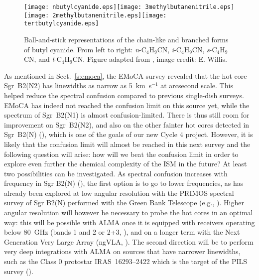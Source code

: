 \documentclass{iau}
\begin{document}
\begin{figure}
\begin{center}
\texttt{[image: nbutylcyanide.eps]}\hspace*{0.03\hsize}\texttt{[image: 3methylbutanenitrile.eps]}\hspace*{0.03\hsize}\texttt{[image: 2methylbutanenitrile.eps]}\hspace*{-0.01\hsize}\texttt{[image: tertbutylcyanide.eps]}
\end{center}
\caption{Ball-and-stick representations of the chain-like and branched forms 
of butyl cyanide. From left to right: \textit{n}-C$_4$H$_9$CN, 
\textit{i}-C$_4$H$_9$CN, \textit{s}-C$_4$H$_9$CN, and \textit{t}-C$_4$H$_9$CN. 
Figure adapted from \cite{Garrod17}, image credit: E. Willis.}
\label{f:bucn}
\end{figure}

As mentioned in Sect.~\ref{s:emoca}, the EMoCA survey revealed that the 
hot core Sgr~B2(N2) has linewidths as narrow as 5~km~s$^{-1}$ at arcsecond
scale. This helped reduce the spectral confusion compared to previous 
single-dish surveys. EMoCA has indeed not reached the confusion limit on 
this source yet, while the spectrum of Sgr~B2(N1) is almost confusion-limited. 
There is thus still room for improvement on Sgr~B2(N2), and also on the other 
fainter hot cores detected in Sgr~B2(N) (\cite{Bonfand17,SanchezMonge17}), 
which is one of the goals of our new Cycle 4 project. However, it is 
likely that the confusion limit will almost be reached in this next survey and
the following question will arise: how will we beat the confusion limit in 
order to explore even further the chemical complexity of the ISM in the
future? At least two possibilities can be investigated. As spectral confusion 
increases with frequency in Sgr B2(N) (\cite{Belloche13}), the first option is 
to go to lower frequencies, as has already been explored at low angular 
resolution with the PRIMOS spectral survey of Sgr B2(N) performed with the 
Green Bank Telescope (e.g., \cite{Neill12}). Higher angular resolution will 
however be necessary to probe the hot cores in an optimal way: this will be 
possible with ALMA once it is equipped with receivers operating below 80~GHz 
(bands 1 and 2 or 2+3, \cite{DiFrancesco13,Fuller16}), and on a longer term 
with the Next Generation Very Large Array (ngVLA, \cite{Hughes15}). The second 
direction will be to perform very deep integrations with ALMA on sources that 
have narrower linewidths, such as the Class 0 protostar IRAS~16293--2422 which 
is the target of the PILS survey (\cite{Jorgensen16}).
\end{document}
